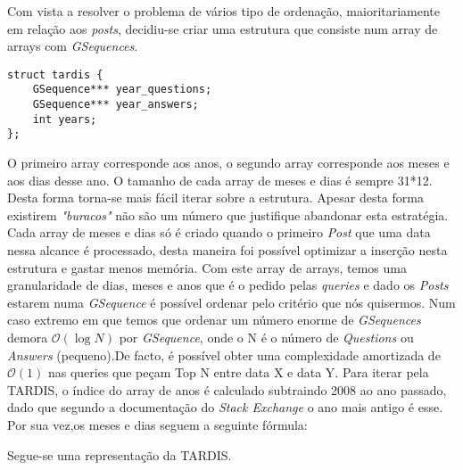 \documentclass[letterpaper, 10 pt, conference]{IEEEtran}  %
\begin{document}
Com vista a resolver o problema de vários tipo de ordenação, maioritariamente em relação aos \textit{posts}, decidiu-se criar uma estrutura que consiste num array de arrays com \textit{GSequences}.
\begin{lstlisting}
struct tardis {
    GSequence*** year_questions;
    GSequence*** year_answers;
    int years;
};

\end{lstlisting}
O primeiro array corresponde aos anos, o segundo array corresponde aos meses e aos dias desse ano. O tamanho de cada array de meses e dias é sempre 31*12. Desta forma torna-se mais fácil iterar sobre a estrutura. Apesar desta forma existirem \textit{"buracos"} não são um número que justifique abandonar esta estratégia.
Cada array de meses e dias só é criado quando o primeiro \textit{Post} que uma data nessa alcance é processado, desta maneira foi possível optimizar a inserção nesta estrutura e gastar menos memória.
Com este array de arrays, temos uma granularidade de dias, meses e anos que é o pedido pelas \textit{queries} e dado os \textit{Posts} estarem numa \textit{GSequence} é possível ordenar pelo critério que nós quisermos.
Num caso extremo em que temos que ordenar um número enorme de \textit{GSequences} demora $\mathcal{O}(\log{}N)$ por \textit{GSequence}, onde o N é o número de \textit{Questions} ou \textit{Answers} (pequeno).De facto, é possível obter uma complexidade amortizada de $\mathcal{O}(1)$ nas queries que peçam Top N entre data X e data Y.
Para iterar pela TARDIS, o índice do array de anos é calculado subtraindo 2008 ao ano passado, dado que segundo a documentação do \textit{Stack Exchange} o ano mais antigo é esse. Por sua vez,os meses e dias seguem a seguinte fórmula:

Segue-se uma representação da TARDIS.
\end{document}
